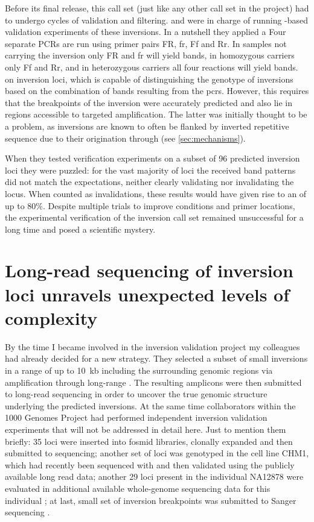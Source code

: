 Before its final release, this call set (just like any other call set in the
project) had to undergo cycles of validation and filtering. \adrian and
\benjamin were in charge of running \pcr-based validation experiments of these
inversions. In a nutshell they applied a 
{ Four separate PCRs
are run using primer pairs FR, fr, Ff and Rr. In samples
not carrying the inversion only FR and fr will yield bands,
in homozygous carriers only Ff and Rr, and in heterozygous
carriers all four reactions will yield bands.}
on inversion loci, which is capable of distinguishing the genotype of inversions
based on the combination of bands resulting from the \acp{pcr}. However,
this requires that the breakpoints of the inversion were accurately predicted
and also lie in regions accessible to targeted \pcr amplification. The latter
was initially thought to be a problem, as inversions are known to often be
flanked by inverted repetitive sequence due to their origination through \nahr
(see \cref{sec:mechanisms}).

When they tested \pcr verification experiments on a subset of 96 predicted
inversion loci they were puzzled: for the vast majority of loci the received
band patterns did not match the expectations, neither clearly validating nor
invalidating the locus. When counted as invalidations, these results would have
given rise to an \fdr of up to 80\%. Despite multiple trials to improve \pcr
conditions and primer locations, the experimental verification of the inversion
call set remained unsuccessful for a long time and posed a scientific mystery.






\section{Long-read sequencing of inversion loci unravels unexpected levels of complexity}
\label{sec:complex_invs_validation}

By the time I became involved in the inversion validation project my colleagues
had already decided for a new strategy. They selected a subset of small
inversions in a range of up to 10~kb including the surrounding genomic regions
via amplification through long-range \pcr. The resulting amplicons were then
submitted to long-read sequencing in order to uncover the true genomic structure
underlying the predicted inversions. At the same time collaborators within the
1000 Genomes Project had performed independent inversion validation experiments
that will not be addressed in detail here. Just to mention them briefly: 35 loci
were inserted into fosmid libraries, clonally expanded and then submitted to
\pacbio sequencing; another set of loci was genotyped in the cell line CHM1,
which had recently been sequenced with \pacbio \citep{Chaisson2014} and then
validated using the publicly available long read data; another 29 loci present
in the individual NA12878 were evaluated in additional available whole-genome
\pacbio sequencing data for this individual \citep{Pendleton2015}; at last, small
set of inversion breakpoints was submitted to Sanger sequencing
\citep[supplementary methods]{Sudmant2015}.


